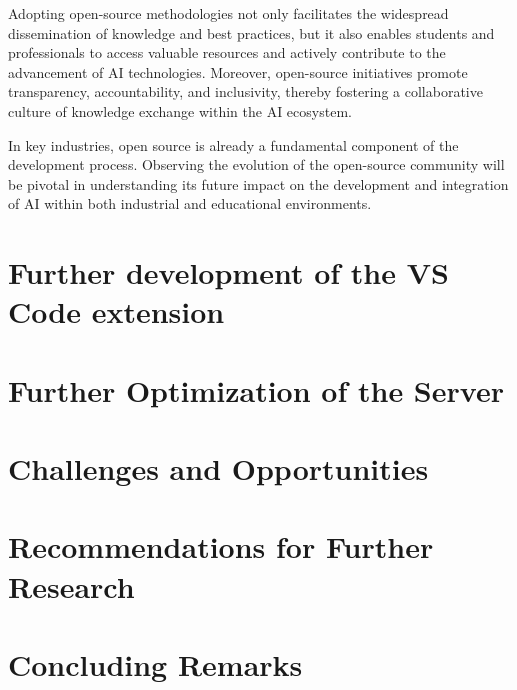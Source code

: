 Adopting open-source methodologies not only facilitates the widespread dissemination of knowledge and best practices, but it also enables students and professionals to access valuable resources and actively contribute to the advancement of AI technologies. Moreover, open-source initiatives promote transparency, accountability, and inclusivity, thereby fostering a collaborative culture of knowledge exchange within the AI ecosystem.

In key industries, open source is already a fundamental component of the development process. Observing the evolution of the open-source community will be pivotal in understanding its future impact on the development and integration of AI within both industrial and educational environments.

\section{Further development of the VS Code extension}

\section{Further Optimization of the Server}

\section{}

\section{Challenges and Opportunities}

\section{Recommendations for Further Research}

\section{Concluding Remarks}
